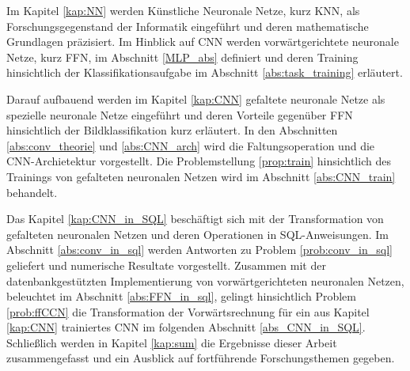 Im Kapitel \ref{kap:NN} werden Künstliche Neuronale Netze, kurz KNN, als Forschungsgegenstand der Informatik eingeführt und deren mathematische Grundlagen präzisiert. Im Hinblick auf CNN werden vorwärtgerichtete neuronale Netze, kurz FFN, im Abschnitt \ref{MLP_abs} definiert und deren Training hinsichtlich der Klassifikationsaufgabe im Abschnitt \ref{abs:task_training} erläutert. 

Darauf aufbauend werden im Kapitel \ref{kap:CNN} gefaltete neuronale Netze als spezielle neuronale Netze eingeführt und deren Vorteile gegenüber FFN hinsichtlich der Bildklassifikation kurz erläutert. In den Abschnitten \ref{abs:conv_theorie} und \ref{abs:CNN_arch} wird die Faltungsoperation und die CNN-Archietektur vorgestellt. Die Problemstellung \ref{prop:train} hinsichtlich des Trainings von gefalteten neuronalen Netzen wird im Abschnitt \ref{abs:CNN_train} behandelt.

Das Kapitel \ref{kap:CNN_in_SQL} beschäftigt sich mit der Transformation von gefalteten neuronalen Netzen und deren Operationen in SQL-Anweisungen. Im Abschnitt \ref{abs:conv_in_sql} werden Antworten zu Problem \ref{prob:conv_in_sql} geliefert und numerische Resultate vorgestellt. Zusammen mit der datenbankgestützten Implementierung von vorwärtgerichteten neuronalen Netzen, beleuchtet im Abschnitt \ref{abs:FFN_in_sql}, gelingt hinsichtlich Problem \ref{prob:ffCCN} die Transformation der Vorwärtsrechnung für ein aus Kapitel \ref{kap:CNN} trainiertes CNN im folgenden Abschnitt \ref{abs_CNN_in_SQL}. Schließlich werden in Kapitel \ref{kap:sum} die Ergebnisse dieser Arbeit zusammengefasst und ein Ausblick auf fortführende Forschungsthemen gegeben.

